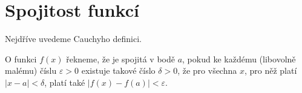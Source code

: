 \section{Spojitost funkcí}
Nejdříve uvedeme Cauchyho definici.
\begin{definition}
O funkci $f(x)$ řekneme, že je spojitá v bodě $a$,
pokud ke každému (libovolně malému) číslu $\varepsilon > 0$
existuje takové číslo $\delta > 0$, že pro všechna
$x$, pro něž platí $|x-a|<\delta$, platí také
$|f(x)-f(a)|<\varepsilon$.
\end{definition}